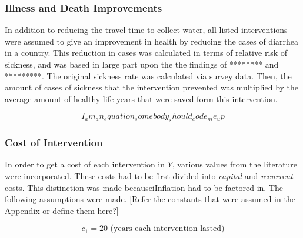 \subsubsection*{Illness and Death Improvements}
In addition to reducing the travel time to collect water, all listed interventions were assumed to give an improvement in health by reducing the cases of diarrhea in a country. 
This reduction in cases was calculated in terms of relative risk of sickness, and was based in large part upon the the findings of ******** and *********.
The original sickness rate was calculated via survey data.
Then, the amount of cases of sickness that the intervention prevented was multiplied by the average amount of healthy life years that were saved form this intervention. 

\begin{equation*}
I_am_an_equation_somebody_should_code_me_up
\end{equation*}

\subsubsection*{Cost of Intervention}
In order to get a cost of each intervention in $Y$, various values from the literature were incorporated.
These costs had to be first divided into \emph{capital} and \emph{recurrent} costs.
This distinction was made becauseiInflation had to be factored in.
The following assumptions were made.
[Refer the constants that were assumed in the Appendix or define them here?]

$$c_1 = 20 \text{ (years each intervention lasted)}$$








